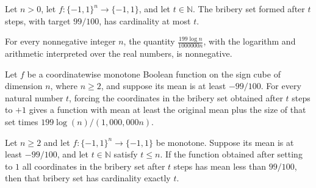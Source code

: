 \begin{theorem}
\label{FABL.card_briberySets_le}
\leanok
{}
Let $n>0$, let $f:\{-1,1\}^n\to\{-1,1\}$, and let $t\in\mathbb N$. The bribery
set formed after $t$ steps, with target $99/100$, has cardinality at most $t$.
\end{theorem}

\begin{theorem}
\label{FABL.briberyIncrement_nonneg}
\leanok
{}
For every nonnegative integer $n$, the quantity $\frac{199\log n}{1000000n}$, with the
logarithm and arithmetic interpreted over the real numbers, is nonnegative.
\end{theorem}

\begin{theorem}
\label{FABL.mean_briberySets_ge_initial_add_card_mul}
\leanok
{}
Let $f$ be a coordinatewise monotone Boolean function on the sign cube of dimension $n$,
where $n\ge 2$, and suppose its mean is at least $-99/100$. For every natural number
$t$, forcing the coordinates in the bribery set obtained after $t$ steps to $+1$ gives a
function with mean at least the original mean plus the size of that set times
$199\log(n)/(1{,}000{,}000n)$.
\end{theorem}

\begin{theorem}
\label{FABL.card_briberySets_eq_of_mean_lt_target}
\leanok
{}
Let $n\ge 2$ and let $f:\{-1,1\}^n\to\{-1,1\}$ be monotone. Suppose its mean is at
least $-99/100$, and let $t\in\mathbb N$ satisfy $t\le n$. If the function obtained
after setting to $1$ all coordinates in the bribery set after $t$ steps has mean less
than $99/100$, then that bribery set has cardinality exactly $t$.
\end{theorem}


